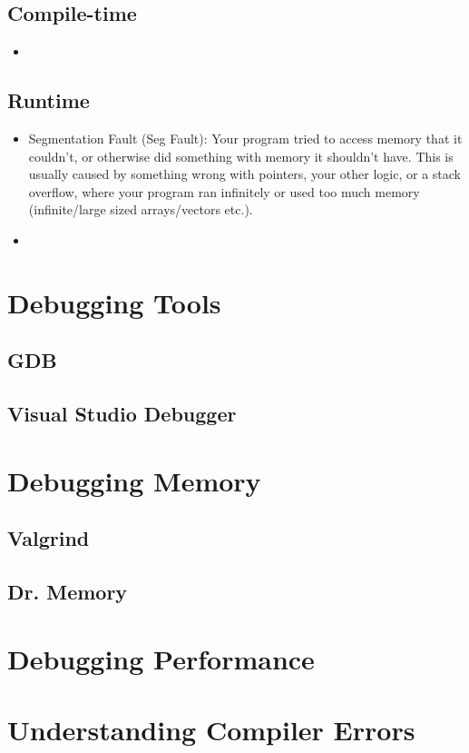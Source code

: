 \documentclass[12pt]{book}
\begin{document}
			\subsection{Compile-time}
				\begin{itemize}
					\item 
				\end{itemize}
			\subsection{Runtime}
				\begin{itemize}
					\item Segmentation Fault (Seg Fault): Your program tried to access memory that it couldn't, or otherwise did something with memory it shouldn't have.  This is usually caused by something wrong with pointers, your other logic, or a stack overflow, where your program ran infinitely or used too much memory (infinite/large sized arrays/vectors etc.).
					\item 
				\end{itemize}
		\section{Debugging Tools}
			\subsection{GDB}
			\subsection{Visual Studio Debugger}
		\section{Debugging Memory}
			\subsection{Valgrind}
			\subsection{Dr. Memory}
		\section{Debugging Performance}
		\section{Understanding Compiler Errors}
			
\end{document}
